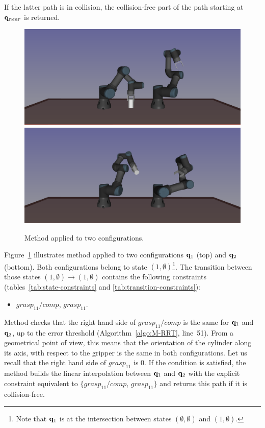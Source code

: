 If the latter path is in collision, the collision-free part of the path starting
at $\mathbf{q}_{near}$ is returned.

\begin{figure}
  \begin{center}
    \includegraphics[width=.75\linewidth]{figures/example-qtarget-1.png}
    \includegraphics[width=.75\linewidth]{figures/example-connect-q1.png}
  \end{center}
  \caption{Method \CONNECT applied to two configurations.}
  \label{fig:connect}
\end{figure}

Figure~\ref{fig:connect} illustrates method \CONNECT applied to two configurations $\mathbf{q}_1$ (top) and $\mathbf{q}_2$ (bottom). Both configurations belong to state $(1,\emptyset)$\footnote{Note that $\mathbf{q}_1$ is at the intersection between states
  $(\emptyset,\emptyset)$ and $(1,\emptyset)$.}. The transition between those states $(1,\emptyset)\rightarrow(1,\emptyset)$ contains the following constraints (tables~\ref{tab:state-constraints} and \ref{tab:transition-constraints}):
\begin{itemize}
\item $grasp_{11}/comp$, $grasp_{11}$.
\end{itemize}
Method \CONNECT checks that the right hand side of $grasp_{11}/comp$ is the same
for $\mathbf{q}_1$ and $\mathbf{q}_2$, up to the error threshold (Algorithm~\ref{algo:M-RRT}, line~51). From a geometrical point of view, this means that the orientation of the cylinder along its axis, with respect to the gripper is the same in both configurations. Let us recall that the right hand side of $grasp_{11}$ is 0. If the condition is satisfied, the method builds the linear interpolation between $\mathbf{q}_1$ and $\mathbf{q}_2$ with the explicit constraint equivalent to $\{grasp_{11}/comp$, $grasp_{11}\}$ and returns this path if it is collision-free.

